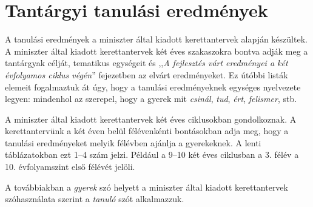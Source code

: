 \documentclass[10pt,openright,twoside]{book}
\newcommand*\cleartoleftpage{%
  \clearpage
  \ifodd\value{page}\hbox{}\newpage\fi
}
\newcommand{\chaptercover}[1]{
    \cleartoleftpage
    
}
\begin{document}



\chaptercover{pics/chapter_covers/6d.JPG}

\chapter{Tantárgyi tanulási eredmények}
\label{sec:tantargyi_tanulasi_eredmenyek}

A tanulási eredmények a miniszter által kiadott kerettantervek \cite{ofi:kerettanterv} alapján készültek. A miniszter által kiadott kerettantervek két éves szakaszokra bontva adják meg a tantárgyak célját, tematikus egységeit és ,,\emph{A fejlesztés várt eredményei a két évfolyamos ciklus végén}'' fejezetben az elvárt eredményeket. Ez útóbbi listák elemeit fogalmaztuk át úgy, hogy a tanulási eredményeknek egységes nyelvezete legyen: mindenhol az szerepel, hogy a gyerek mit \emph{csinál}, \emph{tud}, \emph{ért}, \emph{felismer}, stb.

A miniszter által kiadott kerettantervek két éves ciklusokban gondolkoznak. A kerettantervünk a két éven belül félévenkénti bontásokban adja meg, hogy a tanulási eredményeket melyik félévben ajánlja a gyerekeknek. A lenti táblázatokban ezt 1--4 szám jelzi. Például a 9--10 két éves ciklusban a 3. félév a 10. évfolyamszint első félévét jelöli.

A továbbiakban a \emph{gyerek} szó helyett a miniszter által kiadott kerettantervek szóhasználata szerint a \emph{tanuló} szót alkalmazzuk.



{}
\label{sec:bibliographyk}

\end{document}
